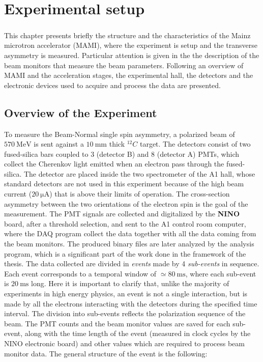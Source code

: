 \chapter{Experimental setup} 

\paragraph{} This chapter presents briefly the structure and the characteristics of the Mainz microtron accelerator (MAMI), where the experiment is setup and the transverse asymmetry is measured. Particular attention is given in the the description of the beam monitors that measure the beam parameters. Following an overview of MAMI and the acceleration stages, the experimental hall, the detectors and the electronic devices used to acquire and process the data are presented. 

\section{Overview of the Experiment} \label{FirstDescription}

To measure the Beam-Normal single spin asymmetry, a polarized beam of $ \SI{570}{\mega \electronvolt}$ is sent against a $\SI{10}{\milli \meter}$ thick $^{12}C$ target. The detectors consist of two fused-silica bars coupled to 3 (detector B) and 8 (detector A) PMTs, which collect the Cherenkov light emitted when an electron pass through the fused-silica. 
The detector are placed inside the two spectrometer of the A1 hall, whose standard detectors are not used in this experiment because of the high beam current ($ \SI{20}{\micro \ampere}$) that is above their limits of operation. 
The cross-section asymmetry between the two orientations of the electron spin is the goal of the measurement. The PMT signals are collected and digitalized by the \textbf{NINO} board, after a threshold selection, and sent to the A1 control room computer, where the DAQ program collect the data together with all the data coming from the beam monitors. The produced  binary files are later analyzed by the analysis program, which is a significant part of the work done in the framework of the thesis. 
The data collected are divided in \textit{events} made by 4 \textit{sub-events} in sequence. Each event corresponds to a temporal window of $\simeq \SI{80}{\milli \second}$, where each sub-event is $\SI{20}{\milli \second}$ long.
Here it is important to clarify that, unlike the majority of experiments in high energy physics, an event is not a single interaction, but is made by all the electrons interacting with the detectors during the specified time interval. The division into sub-events reflects the polarization sequence of the beam. The PMT counts and the beam monitor values are saved for each sub-event, along with the time length of the event (measured in clock cycles by the NINO electronic board) and other values which are required to process beam monitor data.
The general structure of the event is the following: 

